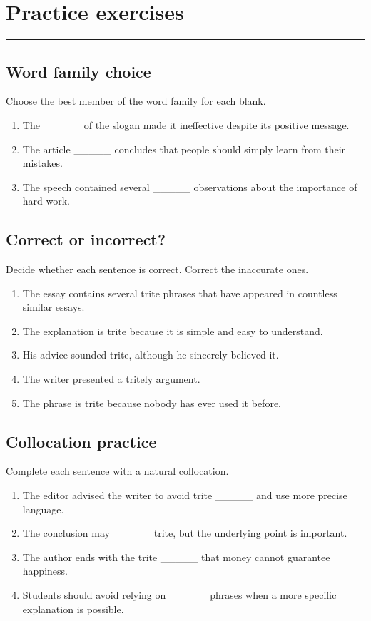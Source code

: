 \documentclass[11pt]{article}
\newcommand{\sectionrule}{\par\vspace{-0.5em}\noindent\textcolor{Accent}{\rule{\linewidth}{0.6pt}}\par}
\begin{document}
\section{Practice exercises}
\sectionrule
\subsection{Word family choice}
Choose the best member of the word family for each blank.

\begin{enumerate}
  \item The \_\_\_\_\_ of the slogan made it ineffective despite its positive message.
  \item The article \_\_\_\_\_ concludes that people should simply learn from their mistakes.
  \item The speech contained several \_\_\_\_\_ observations about the importance of hard work.
\end{enumerate}

\subsection{Correct or incorrect?}
Decide whether each sentence is correct. Correct the inaccurate ones.

\begin{enumerate}
  \item The essay contains several trite phrases that have appeared in countless similar essays.
  \item The explanation is trite because it is simple and easy to understand.
  \item His advice sounded trite, although he sincerely believed it.
  \item The writer presented a tritely argument.
  \item The phrase is trite because nobody has ever used it before.
\end{enumerate}

\subsection{Collocation practice}
Complete each sentence with a natural collocation.

\begin{enumerate}
  \item The editor advised the writer to avoid trite \_\_\_\_\_ and use more precise language.
  \item The conclusion may \_\_\_\_\_ trite, but the underlying point is important.
  \item The author ends with the trite \_\_\_\_\_ that money cannot guarantee happiness.
  \item Students should avoid relying on \_\_\_\_\_ phrases when a more specific explanation is possible.
\end{enumerate}
\end{document}
